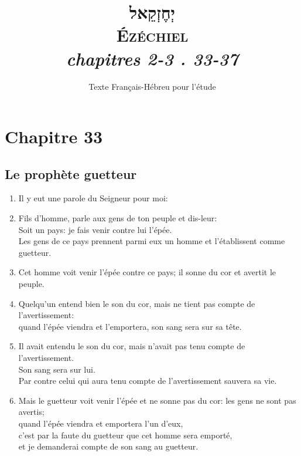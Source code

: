 \documentclass[12pt,a4paper,titlepage]{article}
\title{\vspace{5cm} \fontsize{50}{60}\selectfont \texthebrew{יְחֶזְקֵאל}\\
\fontsize{40}{50}\selectfont \textsc{Ézéchiel} \\
\Large \textit{chapitres 2-3 . 33-37}}
\date{Texte Français-Hébreu pour l'étude}
\def \pslabelsep{0.2em} %
\def \psleftmargin{0em} %
\begin{document}
\maketitle
\vfill

\newpage 


\newpage

\newpage

\vfill

\noindent
\section*{Chapitre 33}
\subsection*{Le prophète guetteur}
\begin{enumerate}[leftmargin=\psleftmargin, labelsep = \pslabelsep, label={\arabic*}, font=\color{\pscolor}\small\textsuperscript, parsep=0em, itemsep=0em, topsep=0em ]
\item Il y eut une parole du Seigneur pour moi:
\item Fils d’homme, parle aux gens de ton peuple et dis-leur: \\ Soit un pays: je fais venir contre lui l’épée.\\ Les gens de ce pays prennent parmi eux un homme et l’établissent comme guetteur.
\item Cet homme voit venir l’épée contre ce pays; il sonne du cor et avertit le peuple.
\item Quelqu’un entend bien le son du cor, mais ne tient pas compte de l’avertissement: \\ quand l’épée viendra et l’emportera, son sang sera sur sa tête. 
\item Il avait entendu le son du cor, mais n’avait pas tenu compte de l’avertissement. \\ Son sang sera sur lui. \\ Par contre celui qui aura tenu compte de l’avertissement sauvera sa vie. 
\item Mais le guetteur voit venir l’épée et ne sonne pas du cor: les gens ne sont pas avertis; \\ quand l’épée viendra et emportera l’un d’eux, \\ c’est par la faute du guetteur que cet homme sera emporté, 
\\ et je demanderai compte de son sang au guetteur. \parSpace


\end{enumerate}
\end{document}

